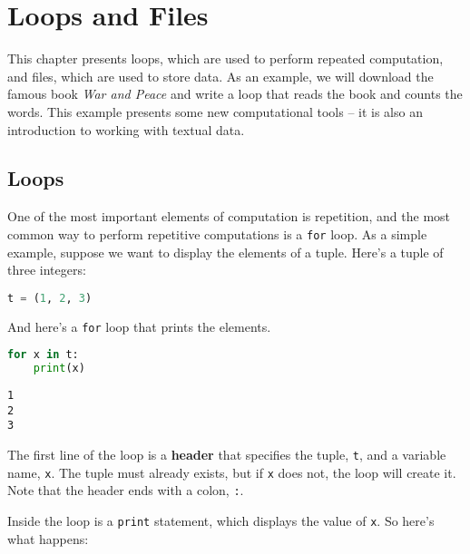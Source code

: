 \chapter{Loops and Files}\label{loops-and-files}

This chapter presents loops, which are used to perform repeated
computation, and files, which are used to store data. As an example, we
will download the famous book \emph{War and Peace} and write a loop that
reads the book and counts the words. This example presents some new
computational tools -- it is also an introduction to working with
textual data.

\section{Loops}\label{loops}

One of the most important elements of computation is repetition, and the
most common way to perform repetitive computations is a
\passthrough{\lstinline!for!} loop. As a simple example, suppose we want
to display the elements of a tuple. Here's a tuple of three integers:

\begin{lstlisting}[language=Python,style=source]
t = (1, 2, 3)
\end{lstlisting}

And here's a \passthrough{\lstinline!for!} loop that prints the
elements.

\begin{lstlisting}[language=Python,style=source]
for x in t:
    print(x)
\end{lstlisting}

\begin{lstlisting}[style=output]
1
2
3
\end{lstlisting}

The first line of the loop is a \textbf{header} that specifies the
tuple, \passthrough{\lstinline!t!}, and a variable name,
\passthrough{\lstinline!x!}. The tuple must already exists, but if
\passthrough{\lstinline!x!} does not, the loop will create it. Note that
the header ends with a colon, \passthrough{\lstinline!:!}.

\pagebreak

Inside the loop is a \passthrough{\lstinline!print!} statement, which
displays the value of \passthrough{\lstinline!x!}. So here's what
happens:

